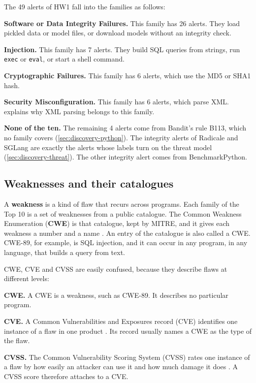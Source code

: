 The 49 alerts of HW1 fall into the families as follows:
\bi
\item \textbf{Software or Data Integrity Failures.} This family has 26 alerts. They load pickled
data or model files, or download models without an integrity check.
\item \textbf{Injection.} This family has 7 alerts. They build SQL queries from strings, run
\texttt{exec} or \texttt{eval}, or start a shell command.
\item \textbf{Cryptographic Failures.} This family has 6 alerts, which use the MD5 or SHA1 hash.
\item \textbf{Security Misconfiguration.} This family has 6 alerts, which parse XML.
 explains why XML parsing belongs to this family.
\item \textbf{None of the ten.} The remaining 4 alerts come from Bandit's rule B113, which no family
covers (\cref{sec:discovery-python}).
\ei
The integrity alerts of Radicale and SGLang are exactly the alerts whose labels turn on the threat
model (\cref{sec:discovery-threat}). The other integrity alert comes from BenchmarkPython.

\subsection{Weaknesses and their catalogues}
\label{sec:discovery-cwe}

A \textbf{weakness} is a kind of flaw that recurs across programs. Each family of the Top 10 is a
set of weaknesses from a public catalogue. The Common Weakness Enumeration (\textbf{CWE}) is that
catalogue, kept by MITRE, and it gives each weakness a number and a name \citep{mitre-cwe}. An entry
of the catalogue is also called a CWE. CWE-89, for example, is SQL injection, and it can occur in
any program, in any language, that builds a query from text.

CWE, CVE and CVSS are easily confused, because they describe flaws at different levels:
\bi
\item \textbf{CWE.} A CWE is a weakness, such as CWE-89. It describes no particular program.
\item \textbf{CVE.} A Common Vulnerabilities and Exposures record (CVE) identifies one
instance of a flaw in one product \citep{cve-program}. Its record usually names a CWE as the type
of the flaw.
\item \textbf{CVSS.} The Common Vulnerability Scoring System (CVSS) rates one instance of a
flaw by how easily an attacker can use it and how much damage it does
\citep{first2023cvss4}. A CVSS score therefore attaches to a CVE.
\ei

